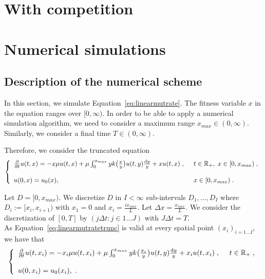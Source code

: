 \documentclass[11pt]{amsart}
\begin{document}
\section{With competition}

\appendix

\section{Numerical simulations}

\subsection{Description of the numerical scheme}

In this section, we simulate Equation~\eqref{eq:linearmutrate}. The fitness variable $x$ in the equation ranges over $[0,\infty)$. In order to be able to apply a numerical simulation algorithm, we need to consider a maximum range $x_{max} \in (0,\infty)$. Similarly, we consider a final time $T \in (0,\infty)$.

Therefore, we consider the truncated equation
\begin{equation}\left\{
    \begin{array}{ll}
	\frac{\partial}{\partial t}u(t,x) = - x\mu u(t,x) + \mu \int_{0}^{x_{max}} y k\big( \frac{x}{y}\big) u(t,y) \frac{\mathrm dy}{y} + xu(t,x)
	\; , \enspace
	& t \in \mathbb{R}_+, \; x \in [0,x_{max}) \; ,
	\\ \\
	u(0, x) = u_0(x),
	& x \in [0,x_{max})
	\; .
    \end{array}
	\right.
    \label{eq:linearmutratetrunc}
\end{equation}

Let $D = [0, x_{max})$. We discretize $D$ in $I < \infty$ sub-intervals
$D_1, \ldots, D_I$ where $D_i := [x_i, x_{i+1})$ with $x_1 = 0$ and $x_i = \frac{i x_{max}}{L}$. Let $\Delta x = \frac{x_{max}}{L}$. We consider the discretization of $[0,T]$ by $(j\Delta t : j \in 1\ldots J )$ with $J \Delta t = T$.\\ 

As Equation~\eqref{eq:linearmutratetrunc} is valid at every spatial point $(x_i)_{i = 1 \ldots I}$, we have that
\begin{equation}\left\{
    \begin{array}{ll}
	\frac{\partial}{\partial t}u(t,x_i) = - x_i\mu u(t,x_i) + \mu \int_{0}^{x_{max}} y k\big( \frac{x_i}{y}\big) u(t,y) \frac{\mathrm dy}{y} + x_iu(t,x_i)
	\; , \enspace
	& t \in \mathbb{R}_+ \; ,
	\\ \\
	u(0, x_i) = u_0(x_i),
	\; .
    \end{array}
	\right.
    \label{eq:linearmutratetruncMeshX}
\end{equation}
\end{document}
